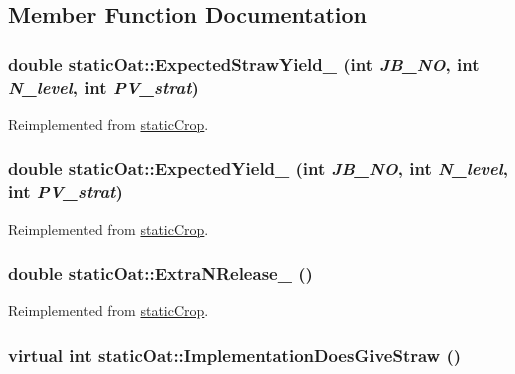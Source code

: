 \subsection{Member Function Documentation}
\hypertarget{classstatic_oat_aec202e3df8d88cde3e5705d6569bdc9c}{
\subsubsection[{ExpectedStrawYield\_\-}]{\setlength{\rightskip}{0pt plus 5cm}double staticOat::ExpectedStrawYield\_\- (int {\em JB\_\-NO}, \/  int {\em N\_\-level}, \/  int {\em PV\_\-strat})}}
\label{classstatic_oat_aec202e3df8d88cde3e5705d6569bdc9c}


Reimplemented from \hyperlink{classstatic_crop_a884a8335aebc5effa3fecdb75af3ca85}{staticCrop}.\hypertarget{classstatic_oat_a640e2c2320b000a47ea5ab306fa2cd2f}{
\subsubsection[{ExpectedYield\_\-}]{\setlength{\rightskip}{0pt plus 5cm}double staticOat::ExpectedYield\_\- (int {\em JB\_\-NO}, \/  int {\em N\_\-level}, \/  int {\em PV\_\-strat})}}
\label{classstatic_oat_a640e2c2320b000a47ea5ab306fa2cd2f}


Reimplemented from \hyperlink{classstatic_crop_ab7b9a8ecb31b10c4dcf44f13000e2f8c}{staticCrop}.\hypertarget{classstatic_oat_ae8bd647d11c451e57a4d195061520529}{
\subsubsection[{ExtraNRelease\_\-}]{\setlength{\rightskip}{0pt plus 5cm}double staticOat::ExtraNRelease\_\- ()}}
\label{classstatic_oat_ae8bd647d11c451e57a4d195061520529}


Reimplemented from \hyperlink{classstatic_crop_afe0cb8a7831afa941a37338f05227d67}{staticCrop}.\hypertarget{classstatic_oat_a75f86a415aa54352870606818273fd94}{
\subsubsection[{ImplementationDoesGiveStraw}]{\setlength{\rightskip}{0pt plus 5cm}virtual int staticOat::ImplementationDoesGiveStraw ()}}
\label{classstatic_oat_a75f86a415aa54352870606818273fd94}


